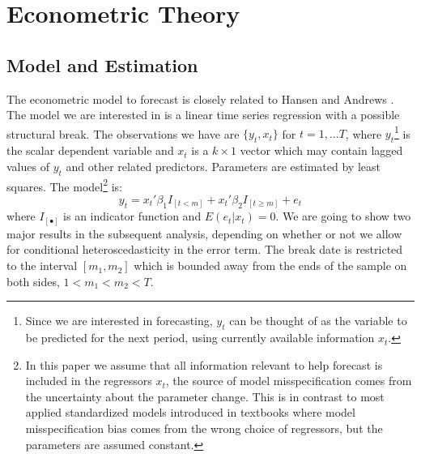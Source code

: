 \documentclass[a4paper,12pt]{article}
\begin{document}
\section{Econometric Theory}
\subsection{Model and Estimation}
The econometric model to forecast is closely related to Hansen \cite{hansen2009averaging} and Andrews \cite{andrews93}. The model we are interested in is a linear time series regression with a possible structural break. The observations we have are $\{y_t,x_t\}$ for $t = 1,...T$, where $y_t$\footnote{Since we are interested in forecasting, $y_t$ can be thought of as the variable to be predicted for the next period, using currently available information $x_t$.} is the scalar dependent variable and $x_t$ is a $k\times 1$ vector which may contain lagged values of $y_t$ and other related predictors. Parameters are estimated by least squares. The model\footnote{In this paper we assume that all information relevant to help forecast is included in the regressors $x_t$, the source of model misspecification comes from the uncertainty about the parameter change. This is in contrast to most applied standardized models introduced in textbooks where model misspecification bias comes from the wrong choice of regressors, but the parameters are assumed constant.} is:
\begin{equation}
	y_t = x_t'\beta_1 I_{[t<m]} + x_t'\beta_2 I_{[t \geq m]} + e_t
\end{equation}
where $I_{[\bullet]}$ is an indicator function and $E(e_t|x_t) = 0$. We are going to show two major results in the subsequent analysis, depending on whether or not we allow for conditional heteroscedasticity in the error term. The break date is restricted to the interval $[m_1,m_2]$ which is bounded away from the ends of the sample on both sides, $1 < m_{1} < m_{2} < T$.
\end{document}
